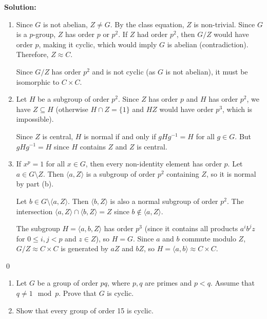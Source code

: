 \noindent\textbf{Solution:}
\begin{enumerate}[label=(\alph*)]
\item Since $G$ is not abelian, $Z \neq G$. By the class equation, $Z$ is non-trivial. Since $G$ is a $p$-group, $Z$ has order $p$ or $p^2$. If $Z$ had order $p^2$, then $G/Z$ would have order $p$, making it cyclic, which would imply $G$ is abelian (contradiction). Therefore, $Z \approx C$.

Since $G/Z$ has order $p^2$ and is not cyclic (as $G$ is not abelian), it must be isomorphic to $C \times C$.

\item Let $H$ be a subgroup of order $p^2$. Since $Z$ has order $p$ and $H$ has order $p^2$, we have $Z \subseteq H$ (otherwise $H \cap Z = \{1\}$ and $HZ$ would have order $p^3$, which is impossible).

Since $Z$ is central, $H$ is normal if and only if $gHg^{-1} = H$ for all $g \in G$. But $gHg^{-1} = H$ since $H$ contains $Z$ and $Z$ is central.

\item If $x^p = 1$ for all $x \in G$, then every non-identity element has order $p$. Let $a \in G \setminus Z$. Then $\langle a, Z \rangle$ is a subgroup of order $p^2$ containing $Z$, so it is normal by part (b).

Let $b \in G \setminus \langle a, Z \rangle$. Then $\langle b, Z \rangle$ is also a normal subgroup of order $p^2$. The intersection $\langle a, Z \rangle \cap \langle b, Z \rangle = Z$ since $b \notin \langle a, Z \rangle$.

The subgroup $H = \langle a, b, Z \rangle$ has order $p^3$ (since it contains all products $a^ib^jz$ for $0 \leq i, j < p$ and $z \in Z$), so $H = G$. Since $a$ and $b$ commute modulo $Z$, $G/Z \approx C \times C$ is generated by $aZ$ and $bZ$, so $H = \langle a, b \rangle \approx C \times C$.
\end{enumerate}


\qed
\begin{problembox}
\begin{enumerate}[label=(\alph*)]
\item Let $G$ be a group of order $pq$, where $p, q$ are primes and $p < q$. Assume that $q \neq 1 \mod p$. Prove that $G$ is cyclic.
\item Show that every group of order 15 is cyclic.
\end{enumerate}
\end{problembox}

